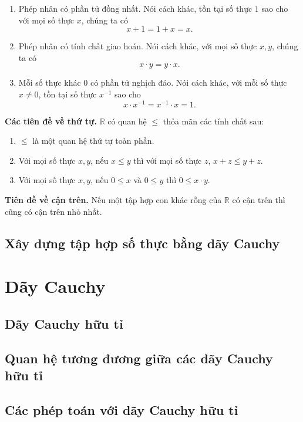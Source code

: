 \begin{axiom}
\begin{enumerate}[label={(\roman*)}]
		\item Phép nhân có phần tử đồng nhất. Nói cách khác, tồn tại số thực $1$ sao cho với mọi số thực $x$, chúng ta có
		      \[
			      x + 1 = 1 + x = x.
		      \]
		\item Phép nhân có tính chất giao hoán. Nói cách khác, với mọi số thực $x, y$, chúng ta có
		      \[
			      x\cdot y = y\cdot x.
		      \]
		\item Mỗi số thực khác $0$ có phần tử nghịch đảo. Nói cách khác, với mỗi số thực $x\ne 0$, tồn tại số thực $x^{-1}$ sao cho
		      \[
			      x\cdot x^{-1} = x^{-1}\cdot x = 1.
		      \]
	\end{enumerate}

	\textbf{Các tiên đề về thứ tự.} $\mathbb{R}$ có quan hệ $\leq$ thỏa mãn các tính chất sau:
	\begin{enumerate}[label={(\roman*)}]
		\item $\leq$ là một quan hệ thứ tự toàn phần.
		\item Với mọi số thực $x, y$, nếu $x\leq y$ thì với mọi số thực $z$, $x + z\leq y + z$.
		\item Với mọi số thực $x, y$, nếu $0\leq x$ và $0\leq y$ thì $0\leq x\cdot y$.
	\end{enumerate}

	\textbf{Tiên đề về cận trên.} Nếu một tập hợp con khác rỗng của $\mathbb{R}$ có cận trên thì cũng có cận trên nhỏ nhất.
\end{axiom}

\subsection{Xây dựng tập hợp số thực bằng dãy Cauchy}

\section{Dãy Cauchy}

\subsection{Dãy Cauchy hữu tỉ}

\subsection{Quan hệ tương đương giữa các dãy Cauchy hữu tỉ}

\subsection{Các phép toán với dãy Cauchy hữu tỉ}

